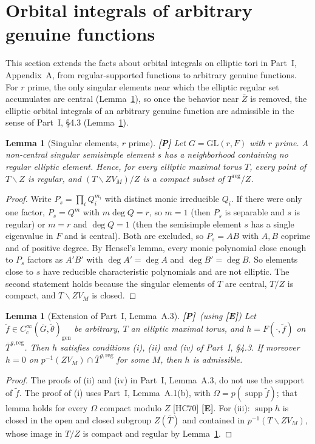 \documentclass[12pt]{article}
\newcommand{\ov}[1]{\overline{#1}}
\newcommand{\gen}{\mathrm{gen}}
\newcommand{\reg}{\mathrm{reg}}
\newcommand{\supp}{\operatorname{supp}}
\newcommand{\GL}{\mathrm{GL}}
\newcommand{\Gb}{\ov{G}}
\newcommand{\Zb}{\ov{Z}}
\newcommand{\Tb}{\ov{T}}
\newcommand{\Pv}{\textbf{[P]}}
\newcommand{\Ev}{\textbf{[E]}}
\theoremstyle{plain}
\newtheorem{lemma}[theorem]{Lemma}
\theoremstyle{definition}
\begin{document}
\section{Orbital integrals of arbitrary genuine functions}\label{sec:arbitrary}
This section extends the facts about orbital integrals on elliptic tori in Part~I, Appendix~A, from regular-supported functions to arbitrary genuine functions. For $r$ prime, the only singular elements near which the elliptic regular set accumulates are central (Lemma~\ref{lem:singular}), so once the behavior near $\Zb$ is removed, the elliptic orbital integrals of an arbitrary genuine function are admissible in the sense of Part~I, \S4.3 (Lemma~\ref{lem:Aext}).

\begin{lemma}[Singular elements, $r$ prime]\label{lem:singular}\Pv
Let $G=\GL(r,F)$ with $r$ prime. A non-central singular semisimple element $s$ has a neighborhood containing no regular elliptic element. Hence, for every elliptic maximal torus $T$, every point of $T\smallsetminus Z$ is regular, and $(T\smallsetminus ZV_M)/Z$ is a compact subset of $T^{\reg}/Z$.
\end{lemma}
\begin{proof}
Write $P_s=\prod_iQ_i^{m_i}$ with distinct monic irreducible $Q_i$. If there were only one factor, $P_s=Q^m$ with $m\deg Q=r$, so $m=1$ (then $P_s$ is separable and $s$ is regular) or $m=r$ and $\deg Q=1$ (then the semisimple element $s$ has a single eigenvalue in $F$ and is central). Both are excluded, so $P_s=AB$ with $A,B$ coprime and of positive degree. By Hensel's lemma, every monic polynomial close enough to $P_s$ factors as $A'B'$ with $\deg A'=\deg A$ and $\deg B'=\deg B$. So elements close to $s$ have reducible characteristic polynomials and are not elliptic. The second statement holds because the singular elements of $T$ are central, $T/Z$ is compact, and $T\smallsetminus ZV_M$ is closed.
\end{proof}

\begin{lemma}[Extension of Part~I, Lemma~A.3]\label{lem:Aext}\Pv\ (using \Ev)
Let $\tilde f\in C_c^\infty(\Gb,\tilde\theta)_\gen$ be arbitrary, $T$ an elliptic maximal torus, and $h=F(\cdot,\tilde f)$ on $\Tb^{g,\reg}$. Then $h$ satisfies conditions (i), (ii) and (iv) of Part~I, \S4.3. If moreover $h=0$ on $p^{-1}(ZV_M)\cap\Tb^{g,\reg}$ for some $M$, then $h$ is admissible.
\end{lemma}
\begin{proof}
The proofs of (ii) and (iv) in Part~I, Lemma~A.3, do not use the support of $\tilde f$. The proof of (i) uses Part~I, Lemma~A.1(b), with $\Omega=p(\supp\tilde f)$; that lemma holds for every $\Omega$ compact modulo $Z$ [HC70] \Ev. For (iii): $\supp h$ is closed in the open and closed subgroup $Z(\Tb)$ and contained in $p^{-1}(T\smallsetminus ZV_M)$, whose image in $T/Z$ is compact and regular by Lemma~\ref{lem:singular}.
\end{proof}
\end{document}
